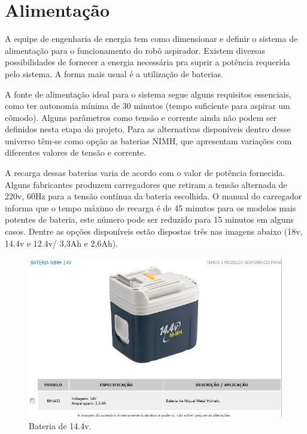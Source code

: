 \section{Alimentação} %
\label{sub:alimentação}
	A equipe de engenharia de energia tem como dimensionar e definir o sistema de alimentação para o funcionamento do robô aspirador. Existem diversas possibilidades de fornecer a energia necessária pra suprir a potência requerida pelo sistema. A forma mais usual é a utilização de baterias.

	A fonte de alimentação ideal para o sistema segue alguns requisitos essenciais, como ter autonomia mínima de 30 minutos (tempo suficiente para aspirar um cômodo). Alguns parâmetros como tensão e corrente ainda não podem ser definidos nesta etapa do projeto. Para as alternativas disponíveis dentro desse universo têm-se como opção as baterias NIMH, que apresentam variações com diferentes valores de tensão e corrente.
	
	A recarga dessas baterias varia de acordo com o valor de potência fornecida. Alguns fabricantes produzem carregadores que retiram a tensão alternada de 220v, 60Hz para a tensão contínua da bateria escolhida. O manual do carregador informa que o tempo máximo de recarga é de 45 minutos para os modelos mais potentes de bateria, este número pode ser reduzido para 15 minutos em alguns casos. Dentre as opções disponíveis estão dispostas três nas imagens abaixo (18v, 14.4v e 12.4v/ 3,3Ah e 2,6Ah).

	\begin{figure}[H]
		\centering
		\includegraphics[scale=0.55]{figuras/bateria_1.png}
		\caption{Bateria de 14.4v.}
		\label{img:bateria_1}
	\end{figure}

